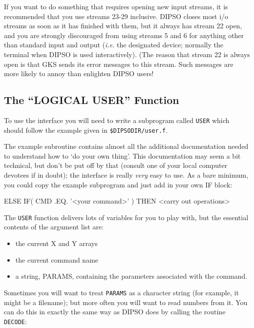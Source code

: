 \documentclass[twoside,11pt,noabs,nolof]{starlink}
\begin{document}
If you want to do something that requires opening new input streams,
it is recommended that you use streams 23-29 inclusive. DIPSO closes
most i/o streams as soon as it has finished with them, but it always
has stream 22 open, and you are strongly discouraged from using
streams 5 and 6 for anything other than standard input and output (\emph{i.e.} the designated device; normally the terminal when DIPSO is used
interactively). (The reason that stream 22 is always open is that GKS
sends its error messages to this stream. Such messages are more likely
to annoy than enlighten DIPSO users!

\subsection {The ``LOGICAL USER'' Function}

To use the interface you will need to write a subprogram called
{\texttt{USER}}  which should follow the example given in {\texttt{\$DIPSODIR/user.f}}.

The example subroutine contains almost all the additional
documentation needed to understand how to `do your own thing'. This
documentation may seem a bit technical, but don't be put off by that
(consult one of your local computer devotees if in doubt); the
interface is really \emph{very} easy to use. As a bare minimum, you
could copy the example subprogram and just add in your own IF block:

\begin{terminalv}
ELSE IF( CMD .EQ. '<your command>' ) THEN
   <carry out operations>
\end{terminalv}

The {\texttt{USER}}  function delivers lots of variables for you to play
with, but the essential contents of the argument list are:

\begin{itemize}
\item the current X and Y arrays
\item the current command name
\item a string, PARAMS, containing the parameters associated with the command.
\end{itemize}

Sometimes you will want to treat {\texttt{PARAMS}}  as a character string (for
example, it might be a filename); but more often you will want to
read numbers from it. You can do this in exactly the same way as DIPSO
does by calling the routine {\texttt{DECODE}}:
\end{document}
